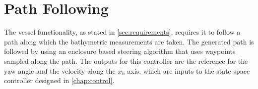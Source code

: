 \chapter{Path Following}
The vessel functionality, as stated in \autoref{sec:requirements}, requires it to follow a path along which the bathymetric measurements are taken.   The generated path is followed by using an enclosure based steering algorithm \cite[pp. 258-265]{TFossen} that uses waypoints sampled along the path. The outputs for this controller are the reference for the yaw angle and the velocity along the $x_\mathrm{b}$ axis, which are inputs to the state space controller designed in \autoref{chap:control}. 